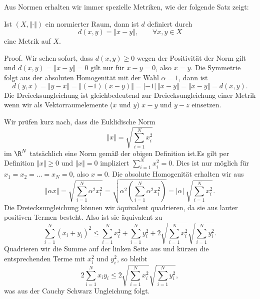 \documentclass[letterpaper,10pt,english]{jupyterBook}
\begin{document}
Aus Normen erhalten wir immer spezielle Metriken, wie der folgende Satz zeigt:
\label{metrik/normen:theorem-2}
\begin{theorem}{}{}



Ist \((X,\Vert \cdot \Vert)\) ein normierter Raum, dann ist \(d\) definiert durch
\begin{equation*}
 d(x,y) = \Vert x - y \Vert ,\qquad \forall x,y \in X
\end{equation*}
eine Metrik auf \(X\).
\end{theorem}

\begin{emphBox}{}{}
Proof. Wir sehen sofort, dass \(d(x,y) \geq 0\) wegen der Positivität der Norm gilt und \(d(x,y) = \Vert x - y\Vert = 0\) gilt nur für \(x-y = 0\), also \(x=y\). Die Symmetrie folgt aus der absoluten Homogenität mit der Wahl \(\alpha = 1\), dann ist
\begin{equation*}
 d(y,x) = \Vert y- x \Vert = \Vert (-1)(x-y) \Vert = |-1|~\Vert x -y \Vert = \Vert x-y \Vert = d(x,y).
\end{equation*}
Die Dreiecksungleichung ist  gleichbedeutend zur Dreiecksungleichung einer Metrik wenn wir als Vektorraumelemente (\(x\) und \(y\)) \(x-y\) und \(y-z\) einsetzen.
\end{emphBox}
\label{metrik/normen:example-3}
\begin{example}{}{}



Wir prüfen kurz nach, dass die Euklidische Norm
\begin{equation*}
 \Vert x \Vert = \sqrt{\sum_{i=1}^N x_i^2}
\end{equation*}
im \(\R^N\) tatsächlich eine Norm gemäß der obigen Definition ist.Es gilt per Definition \(\Vert x \Vert \geq 0\) und \(\Vert x \Vert = 0\) impliziert \(\sum_{i=1}^N x_i^2=0\). Dies ist nur möglich für \(x_1=x_2=\ldots=x_N=0\), also \(x=0\). Die absolute Homogenität erhalten wir aus
\begin{equation*}
 \Vert \alpha x \Vert = \sqrt{\sum_{i=1}^N \alpha ^2 x_i^2} = \sqrt{\alpha^2 (\sum_{i=1}^N \alpha ^2 x_i^2)} = |\alpha|~ \sqrt{\sum_{i=1}^N x_i^2}.\end{equation*}
Die Dreiecksungleichung können wir äquivalent quadrieren, da sie aus lauter positiven Termen besteht. Also ist sie äquivalent zu
\begin{equation*}
  {\sum_{i=1}^N (x_i+y_i)^2} \leq \sum_{i=1}^N x_i^2 + \sum_{i=1}^N y_i^2 + 2 \sqrt{\sum_{i=1}^N x_i^2} \sqrt{\sum_{i=1}^N y_i^2}.
\end{equation*}
Quadrieren wir die Summe auf der linken Seite aus und kürzen die entsprechenden Terme mit \(x_i^2\) und \(y_i^2\), so bleibt
\begin{equation*}
 2 \sum_{i=1}^N x_i y_i \leq 2 \sqrt{\sum_{i=1}^N x_i^2} \sqrt{\sum_{i=1}^N y_i^2},
\end{equation*}
was aus der Cauchy Schwarz Ungleichung folgt.
\end{example}
\end{document}
